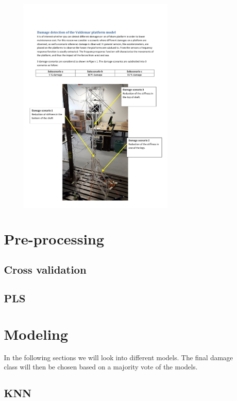 \documentclass[a4paper,draft=false]{scrreprt}\usepackage[]{graphicx}\usepackage[]{color}
\begin{document}
\begin{figure}[hb]
\begin{center}
\includegraphics[width=0.7\textwidth]{Valdemarplatform}
\end{center}
\end{figure}

\chapter{Pre-processing}
\section{Cross validation} %
\section{PLS} %

\chapter{Modeling}

In the following sections we will look into different models. The final damage class will then be chosen based on a majority vote of the models.

\section{KNN} %
\end{document}
